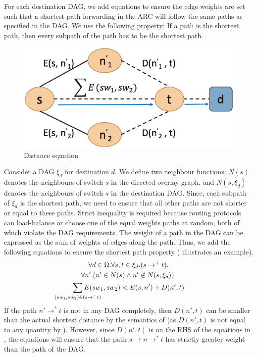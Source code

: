 For each destination DAG, we add equations to ensure the 
edge weights are set such that a shortest-path forwarding in the ARC will 
follow the same paths as specified in the DAG. We use the following
property: If a path is the shortest 
path, then every subpath of the path has to be the shortest path.
\begin{figure}[h!] 
	\centering
	\includegraphics[width=0.8\columnwidth]{figures/distanceEquation.eps}
	\caption{Distance equation} \label{fig:disteq}
\end{figure}
Consider a DAG $\xi_d$ for destination $d$. We define two neighbour
functions: $N(s)$ denotes the neighbours of switch $s$ 
in the directed overlay graph, and $N(s, \xi_d)$ denotes
the neighbours of switch $s$ in the destination DAG. 
Since, each subpath of $\xi_d$ is the shortest path,
we need to ensure that all other
paths are not shorter or equal to these paths.  
Strict inequality is required because routing protocols
can load-balance or choose one of the equal weights paths at
random, both of which violate the DAG requirements. The weight
of a path in the DAG can be expressed as the sum of weights of 
edges along the path. 
Thus, we add the following equations to ensure the
shortest path property ( illustrates 
an example).
\begin{multline} \label{eq:uniq}
		\forall d \in \Omega. \forall s, t \in \xi_d. (s \rightarrow^+ t).\\ 
		\forall n'. (n' \in N(s) \wedge n' \not\in N(s, \xi_d)). \\
		\sum_{\mathclap{\substack{(sw_1, sw_2) \in (s \rightarrow^+ t)}}} 
		E(sw_1, sw_2) < E(s, n') + D(n', t)
\end{multline}
If the path $n' \rightarrow^* t$ 
is not in any DAG completely, then
$D(n',t)$ can be smaller than the actual shortest distance by the
semantics of  (as
$D(n',t)$ is not equal to any quantity by ).
However, since $D(n',t)$ is on the RHS of the equations in ,
the equations will ensure that the path $s\rightarrow n \rightarrow^* t$
has strictly greater weight than the path of the DAG.

